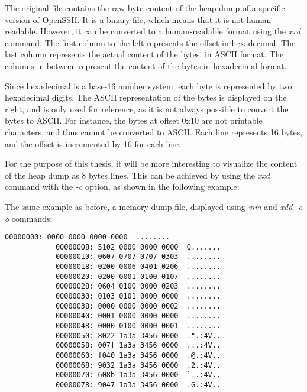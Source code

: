     The original file contains the raw byte content of the heap dump of a specific version of OpenSSH. It is a binary file, which means that it is not human-readable. However, it can be converted to a human-readable format using the \textit{xxd} command. The first column to the left represents the offset in hexadecimal. The last column represents the actual content of the bytes, in ASCII format. The columns in between represent the content of the bytes in hexadecimal format.

    Since hexadecimal is a base-16 number system, each byte is represented by two hexadecimal digits. The ASCII representation of the bytes is displayed on the right, and is only used for reference, as it is not always possible to convert the bytes to ASCII. For instance, the bytes at offset 0x10 are not printable characters, and thus cannot be converted to ASCII. Each line represents 16 bytes, and the offset is incremented by 16 for each line.

    For the purpose of this thesis, it will be more interesting to visualize the content of the heap dump as 8 bytes lines. This can be achieved by using the \textit{xxd} command with the \textit{-c} option, as shown in the following example:

    \begin{minipage}{\dimexpr\linewidth-20pt}
        The same example as before, a memory dump file, displayed using \textit{vim} and \textit{xdd -c 8} commands:

        \begin{lstlisting}[style=hexdump, caption={8 bytes per line visualization of a Hex Dump from \textit{Training/basic/V\_7\_8\_P1/16/5070-1643978841-heap.raw}}, label={lst:hexdump-8bytes}]
            00000000: 0000 0000 0000 0000  ........
            00000008: 5102 0000 0000 0000  Q.......
            00000010: 0607 0707 0707 0303  ........
            00000018: 0200 0006 0401 0206  ........
            00000020: 0200 0001 0100 0107  ........
            00000028: 0604 0100 0000 0203  ........
            00000030: 0103 0101 0000 0000  ........
            00000038: 0000 0000 0000 0002  ........
            00000040: 0001 0000 0000 0000  ........
            00000048: 0000 0100 0000 0001  ........
            00000050: 8022 1a3a 3456 0000  .".:4V..
            00000058: 007f 1a3a 3456 0000  ...:4V..
            00000060: f040 1a3a 3456 0000  .@.:4V..
            00000068: 9032 1a3a 3456 0000  .2.:4V..
            00000070: 608b 1a3a 3456 0000  `..:4V..
            00000078: 9047 1a3a 3456 0000  .G.:4V..
        \end{lstlisting}
    \end{minipage}

